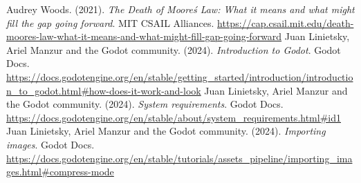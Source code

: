 
\begin{thebibliography}{99}
     Audrey Woods. (2021). \textit{The Death of Moore\'s Law: What it means and what might fill the gap going forward}. MIT CSAIL Alliances. \url{https://cap.csail.mit.edu/death-moores-law-what-it-means-and-what-might-fill-gap-going-forward}
     Juan Linietsky, Ariel Manzur and the Godot community. (2024). \textit{Introduction to Godot}. Godot Docs. \url{https://docs.godotengine.org/en/stable/getting\_started/introduction/introduction\_to\_godot.html#how-does-it-work-and-look}
     Juan Linietsky, Ariel Manzur and the Godot community. (2024). \textit{System requirements}. Godot Docs. \url{https://docs.godotengine.org/en/stable/about/system_requirements.html#id1}
     Juan Linietsky, Ariel Manzur and the Godot community. (2024). \textit{Importing images}. Godot Docs. \url{https://docs.godotengine.org/en/stable/tutorials/assets\_pipeline/importing\_images.html#compress-mode}
    
\end{thebibliography}
